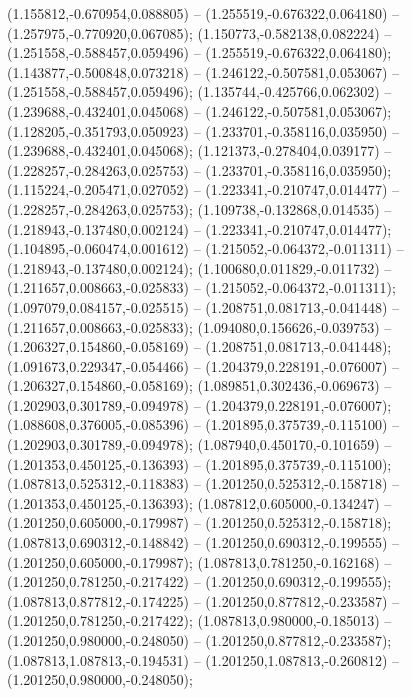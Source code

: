  (1.155812,-0.670954,0.088805) -- (1.255519,-0.676322,0.064180) -- (1.257975,-0.770920,0.067085);
 (1.150773,-0.582138,0.082224) -- (1.251558,-0.588457,0.059496) -- (1.255519,-0.676322,0.064180);
 (1.143877,-0.500848,0.073218) -- (1.246122,-0.507581,0.053067) -- (1.251558,-0.588457,0.059496);
 (1.135744,-0.425766,0.062302) -- (1.239688,-0.432401,0.045068) -- (1.246122,-0.507581,0.053067);
 (1.128205,-0.351793,0.050923) -- (1.233701,-0.358116,0.035950) -- (1.239688,-0.432401,0.045068);
 (1.121373,-0.278404,0.039177) -- (1.228257,-0.284263,0.025753) -- (1.233701,-0.358116,0.035950);
 (1.115224,-0.205471,0.027052) -- (1.223341,-0.210747,0.014477) -- (1.228257,-0.284263,0.025753);
 (1.109738,-0.132868,0.014535) -- (1.218943,-0.137480,0.002124) -- (1.223341,-0.210747,0.014477);
 (1.104895,-0.060474,0.001612) -- (1.215052,-0.064372,-0.011311) -- (1.218943,-0.137480,0.002124);
 (1.100680,0.011829,-0.011732) -- (1.211657,0.008663,-0.025833) -- (1.215052,-0.064372,-0.011311);
 (1.097079,0.084157,-0.025515) -- (1.208751,0.081713,-0.041448) -- (1.211657,0.008663,-0.025833);
 (1.094080,0.156626,-0.039753) -- (1.206327,0.154860,-0.058169) -- (1.208751,0.081713,-0.041448);
 (1.091673,0.229347,-0.054466) -- (1.204379,0.228191,-0.076007) -- (1.206327,0.154860,-0.058169);
 (1.089851,0.302436,-0.069673) -- (1.202903,0.301789,-0.094978) -- (1.204379,0.228191,-0.076007);
 (1.088608,0.376005,-0.085396) -- (1.201895,0.375739,-0.115100) -- (1.202903,0.301789,-0.094978);
 (1.087940,0.450170,-0.101659) -- (1.201353,0.450125,-0.136393) -- (1.201895,0.375739,-0.115100);
 (1.087813,0.525312,-0.118383) -- (1.201250,0.525312,-0.158718) -- (1.201353,0.450125,-0.136393);
 (1.087812,0.605000,-0.134247) -- (1.201250,0.605000,-0.179987) -- (1.201250,0.525312,-0.158718);
 (1.087813,0.690312,-0.148842) -- (1.201250,0.690312,-0.199555) -- (1.201250,0.605000,-0.179987);
 (1.087813,0.781250,-0.162168) -- (1.201250,0.781250,-0.217422) -- (1.201250,0.690312,-0.199555);
 (1.087813,0.877812,-0.174225) -- (1.201250,0.877812,-0.233587) -- (1.201250,0.781250,-0.217422);
 (1.087813,0.980000,-0.185013) -- (1.201250,0.980000,-0.248050) -- (1.201250,0.877812,-0.233587);
 (1.087813,1.087813,-0.194531) -- (1.201250,1.087813,-0.260812) -- (1.201250,0.980000,-0.248050);
